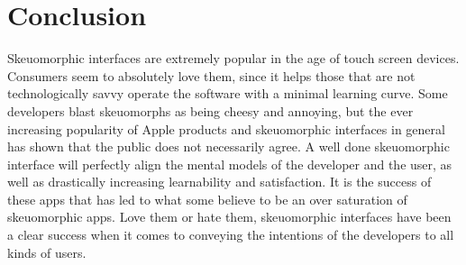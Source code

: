\documentclass{article}
\begin{document}
\section{Conclusion}
	Skeuomorphic interfaces are extremely popular in the age of touch screen devices. Consumers seem to absolutely love them, since it helps those that are not technologically savvy operate the software with a minimal learning curve. Some developers blast skeuomorphs as being cheesy and annoying, but the ever increasing popularity of Apple products and skeuomorphic interfaces in general has shown that the public does not necessarily agree. A well done skeuomorphic interface will perfectly align the mental models of the developer and the user, as well as drastically increasing learnability and satisfaction. It is the success of these apps that has led to what some believe to be an over saturation of skeuomorphic apps. Love them or hate them, skeuomorphic interfaces have been a clear success when it comes to conveying the intentions of the developers to all kinds of users.



\end{document}
